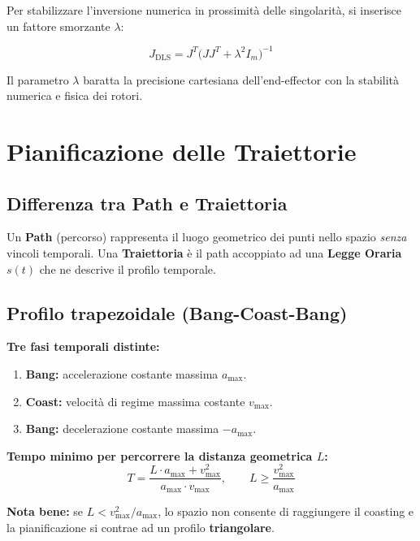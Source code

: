 \documentclass[11pt, a4paper]{article}
\begin{document}
Per stabilizzare l'inversione numerica in prossimità delle singolarità, si inserisce
un fattore smorzante $\lambda$:
\begin{formulabox}
\[
J_{\text{DLS}} = J^T\bigl(JJ^T + \lambda^2 I_m\bigr)^{-1}
\]
\end{formulabox}

Il parametro $\lambda$ baratta la precisione cartesiana dell'end-effector con la stabilità
numerica e fisica dei rotori.

\section{Pianificazione delle Traiettorie}

\subsection{Differenza tra Path e Traiettoria}

Un \textbf{Path} (percorso) rappresenta il luogo geometrico dei punti nello spazio
\emph{senza} vincoli temporali. Una \textbf{Traiettoria} è il path accoppiato ad una
\textbf{Legge Oraria} $s(t)$ che ne descrive il profilo temporale.

\subsection{Profilo trapezoidale (Bang-Coast-Bang)}

\begin{formulabox}
\textbf{Tre fasi temporali distinte:}
\begin{enumerate}[itemsep=2pt]
  \item \textbf{Bang:} accelerazione costante massima $a_{\max}$.
  \item \textbf{Coast:} velocità di regime massima costante $v_{\max}$.
  \item \textbf{Bang:} decelerazione costante massima $-a_{\max}$.
\end{enumerate}

\medskip
\textbf{Tempo minimo per percorrere la distanza geometrica $L$:}
\[
T = \frac{L\cdot a_{\max} + v_{\max}^2}{a_{\max}\cdot v_{\max}}, \qquad
L \ge \frac{v_{\max}^2}{a_{\max}}
\]
\end{formulabox}

\textbf{Nota bene:} se $L < v_{\max}^2/a_{\max}$, lo spazio non consente di raggiungere il
coasting e la pianificazione si contrae ad un profilo \textbf{triangolare}.
\end{document}
